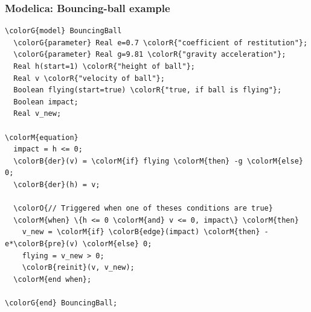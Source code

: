 \begin{frame}[fragile]
  \frametitle{Modelica: Bouncing-ball example}
  \fontsize{8pt}{8pt}\selectfont
\begin{Verbatim}[commandchars=\\\{\}]
\colorG{model} BouncingBall
  \colorG{parameter} Real e=0.7 \colorR{"coefficient of restitution"};
  \colorG{parameter} Real g=9.81 \colorR{"gravity acceleration"};
  Real h(start=1) \colorR{"height of ball"};
  Real v \colorR{"velocity of ball"};
  Boolean flying(start=true) \colorR{"true, if ball is flying"};
  Boolean impact;
  Real v_new;

\colorM{equation}
  impact = h <= 0;
  \colorB{der}(v) = \colorM{if} flying \colorM{then} -g \colorM{else} 0;
  \colorB{der}(h) = v;

  \colorO{// Triggered when one of theses conditions are true}
  \colorM{when} \{h <= 0 \colorM{and} v <= 0, impact\} \colorM{then}
    v_new = \colorM{if} \colorB{edge}(impact) \colorM{then} -e*\colorB{pre}(v) \colorM{else} 0;
    flying = v_new > 0;
    \colorB{reinit}(v, v_new);
  \colorM{end when};

\colorG{end} BouncingBall;
\end{Verbatim}
  \normalsize
\end{frame}

